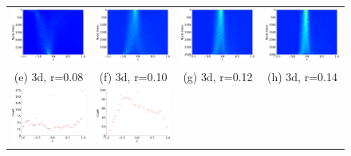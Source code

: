 \documentclass[senior,final,11pt]{iscs-thesis}
\begin{document}
\begin{figure}[htbp]
\begin{tabular}{cccc}
    \includegraphics[width=45mm]{figure/random_geometric_graph_n3000_radius008_dim3txt_pdos.png} &
    \includegraphics[width=45mm]{figure/random_geometric_graph_n3000_radius01_dim3txt_pdos.png} &
    \includegraphics[width=45mm]{figure/random_geometric_graph_n3000_radius012_dim3txt_pdos.png} &
    \includegraphics[width=45mm]{figure/random_geometric_graph_n3000_radius014_dim3txt_pdos.png} \\
    (e) 3d, r=0.08 & (f) 3d, r=0.10& (g) 3d, r=0.12 & (h) 3d, r=0.14\\ [6pt]
    \includegraphics[width=45mm]{figure/random_geometric_graph_n3000_radius05_dim10txt_dos.png} &
    \includegraphics[width=45mm]{figure/random_geometric_graph_n3000_radius055_dim10txt_dos.png} &

\end{tabular}
\end{figure}
\end{document}
